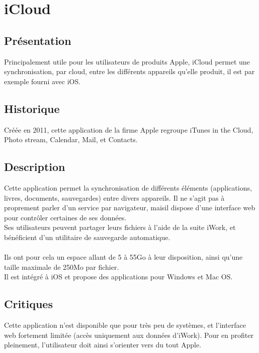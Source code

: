 \section{iCloud}
\thispagestyle{EIP} %

\subsection{Présentation}
Principalement utile pour les utilisateurs de produits Apple, iCloud permet une synchronisation, par cloud, entre les différents appareils qu'elle produit, il est par exemple fourni avec iOS.

\subsection{Historique}
Créée en 2011, cette application de la firme Apple regroupe iTunes in the Cloud, Photo stream, Calendar, Mail, et Contacts.

\subsection{Description}
Cette application permet la synchronisation de différents éléments (applications, livres, documents, sauvegardes) entre divers appareils. Il ne s'agit pas à proprement parler d'un service par navigateur, maisil dispose d'une interface web pour contrôler certaines de ses données.\\
Ses utilisateurs peuvent partager leurs fichiers à l'aide de la suite iWork, et bénéficient d'un utilitaire de sauvegarde automatique.\\
\\
Ils ont pour cela un espace allant de 5 à 55Go à leur disposition, ainsi qu'une taille maximale de 250Mo par fichier.\\
Il est intégré à iOS et propose des applications pour Windows et Mac OS.\\

\subsection{Critiques}
Cette application n'est disponible que pour très peu de systèmes, et l'interface web fortement limitée (accès uniquement aux données d'iWork). Pour en profiter pleinement, l'utilisateur doit ainsi s'orienter vers du tout Apple.